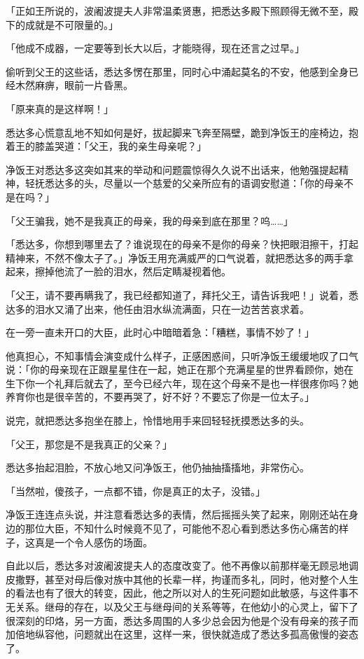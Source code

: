 \documentclass[twoside,openany]{book}
\begin{document}
「正如王所说的，波阇波提夫人非常温柔贤惠，把悉达多殿下照顾得无微不至，殿下的成就是不可限量的。」

「他成不成器，一定要等到长大以后，才能晓得，现在还言之过早。」

偷听到父王的这些话，悉达多愣在那里，同时心中涌起莫名的不安，他感到全身已经木然麻痹，眼前一片昏黑。

「原来真的是这样啊！」

悉达多心慌意乱地不知如何是好，拔起脚来飞奔至隔壁，跪到净饭王的座椅边，抱着王的膝盖哭道：「父王，我的亲生母亲呢？」

净饭王对悉达多这突如其来的举动和问题震惊得久久说不出话来，他勉强提起精神，轻抚悉达多的头，尽量以一个慈爱的父亲所应有的语调安慰道：「你的母亲不是在吗？」

「父王骗我，她不是我真正的母亲，我的母亲到底在那里？呜……」

「悉达多，你想到哪里去了？谁说现在的母亲不是你的母亲？快把眼泪擦干，打起精神来，不然不像太子了。」净饭王用充满威严的口气说着，就把悉达多的两手拿起来，擦掉他流了一脸的泪水，然后定睛凝视着他。

「父王，请不要再瞒我了，我已经都知道了，拜托父王，请告诉我吧！」说着，悉达多的泪水又涌了出来，他任由泪水纵流满面，只在一边苦苦哀求着。

在一旁一直未开口的大臣，此时心中暗暗着急：「糟糕，事情不妙了！」

他真担心，不知事情会演变成什么样子，正感困惑间，只听净饭王缓缓地叹了口气说：「你的母亲现在正跟星星住在一起，她正在那个充满星星的世界看顾你，她在生下你一个礼拜后就去了，至今已经六年，现在这个母亲不是也一样很疼你吗？她养育你也是很辛苦的，不要再哭了，好不好？不要忘了你是一位太子。」

说完，就把悉达多抱坐在膝上，怜惜地用手来回轻轻抚摸悉达多的头。

「父王，那您是不是我真正的父亲？」

悉达多抬起泪脸，不放心地又问净饭王，他仍抽抽搐搐地，非常伤心。

「当然啦，傻孩子，一点都不错，你是真正的太子，没错。」

净饭王连连点头说，并注意看悉达多的表情，然后摇摇头笑了起来，刚刚还站在身边的那位大臣，不知什么时候竟不见了，可能他不忍心看到悉达多伤心痛苦的样子，这真是一个令人感伤的场面。

自此以后，悉达多对波阇波提夫人的态度改变了。他不再像以前那样毫无顾忌地调皮撒野，甚至对母后像对族中其他的长辈一样，拘谨而多礼，同时，他对整个人生的看法也有了很大的转变，因此，他之所以对人的生死问题如此敏感，与这件事不无关系。继母的存在，以及父王与继母间的关系等等，在他幼小的心灵上，留下了很深刻的印烙，另一方面，悉达多周围的人多少总会因为他是个没有母亲的孩子而加倍地纵容他，问题就出在这里，这样一来，很快就造成了悉达多孤高傲慢的姿态了。
\end{document}

